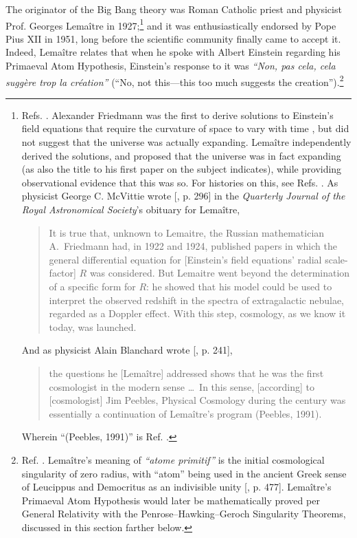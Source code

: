 \documentclass[letterpaper,12pt]{article}
\begin{document}
The originator of the Big Bang theory was Roman Catholic priest and physicist Prof. Georges Lema\^{i}tre in 1927;\footnote{Refs. . Alexander Friedmann was the first to derive solutions to Einstein's field equations that require the curvature of space to vary with time \cite{Friedmann1922,Friedmann1924}, but did not suggest that the universe was actually expanding. Lema\^{i}tre independently derived the solutions, and proposed that the universe was in fact expanding (as also the title to his first paper \cite{Lemaitre1927} on the subject indicates), while providing observational evidence that this was so. For histories on this, see Refs. . As physicist George C. McVittie wrote [, p. 296] in the \emph{Quarterly Journal of the Royal Astronomical Society}'s obituary for Lema\^{i}tre, \begin{quote}
It is true that, unknown to Lemaitre, the Russian mathematician A.~Friedmann had, in 1922 and 1924, published papers in which the general differential equation for [Einstein's field equations' radial scale-factor] \( R \) was considered. But Lemaitre went beyond the determination of a specific form for \( R \): he showed that his model could be used to interpret the observed redshift in the spectra of extragalactic nebulae, regarded as a Doppler effect. With this step, cosmology, as we know it today, was launched.
\end{quote} And as physicist Alain Blanchard wrote [, p. 241], \begin{quote}
the questions he [Lema\^{i}tre] addressed shows that he was the first cosmologist in the modern sense \ldots\ In this sense, [according] to [cosmologist] Jim Peebles, Physical Cosmology during the century was essentially a continuation of Lema\^{i}tre's program (Peebles, 1991).
\end{quote} Wherein ``(Peebles, 1991)'' is Ref. .} and it was enthusiastically endorsed by Pope Pius XII in 1951, long before the scientific community finally came to accept it. Indeed, Lema\^{i}tre relates that when he spoke with Albert Einstein regarding his Primaeval Atom Hypothesis, Einstein's response to it was \emph{``Non, pas cela, cela sugg\`{e}re trop la cr\'{e}ation''} (``No, not this---this too much suggests the creation'').\footnote{Ref. . Lema\^{i}tre's meaning of \emph{``atome primitif''} is the initial cosmological singularity of zero radius, with ``atom'' being used in the ancient Greek sense of Leucippus and Democritus as an indivisible unity [, p. 477]. Lema\^{i}tre's Primaeval Atom Hypothesis would later be mathematically proved per General Relativity with the Penrose--Hawking--Geroch Singularity Theorems, discussed in this section farther below.}
\end{document}
